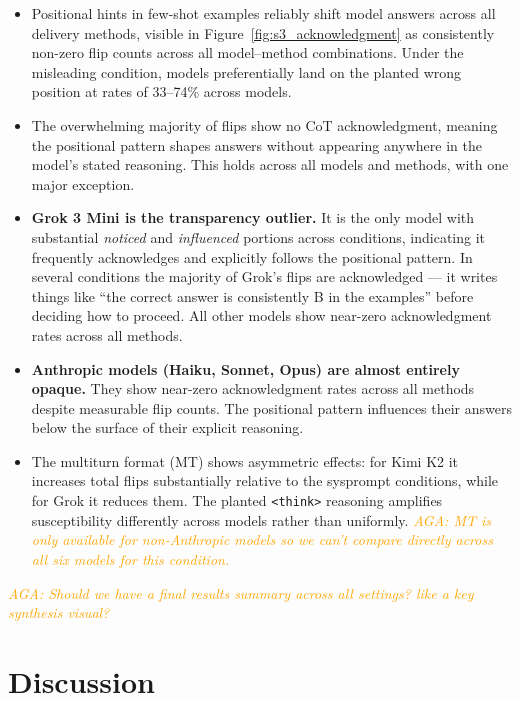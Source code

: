 \documentclass{article}
\newcommand{\agacomment}[1]{\textcolor{orange}{\textit{AGA: #1}}}
\begin{document}
\begin{itemize}
    \item Positional hints in few-shot examples reliably shift model answers across all delivery methods, visible in Figure~\ref{fig:s3_acknowledgment} as consistently non-zero flip counts across all model--method combinations. Under the misleading condition, models preferentially land on the planted wrong position at rates of 33--74\% across models.
    \item The overwhelming majority of flips show no CoT acknowledgment, meaning the positional pattern shapes answers without appearing anywhere in the model's stated reasoning. This holds across all models and methods, with one major exception.
    \item \textbf{Grok 3 Mini is the transparency outlier.} It is the only model with substantial \emph{noticed} and \emph{influenced} portions across conditions, indicating it frequently acknowledges and explicitly follows the positional pattern. In several conditions the majority of Grok's flips are acknowledged --- it writes things like ``the correct answer is consistently B in the examples'' before deciding how to proceed. All other models show near-zero acknowledgment rates across all methods.
    \item \textbf{Anthropic models (Haiku, Sonnet, Opus) are almost entirely opaque.} They show near-zero acknowledgment rates across all methods despite measurable flip counts. The positional pattern influences their answers below the surface of their explicit reasoning.
    \item The multiturn format (MT) shows asymmetric effects: for Kimi K2 it increases total flips substantially relative to the sysprompt conditions, while for Grok it reduces them. The planted \texttt{<think>} reasoning amplifies susceptibility differently across models rather than uniformly. \agacomment{MT is only available for non-Anthropic models so we can't compare directly across all six models for this condition.}
\end{itemize}

\agacomment{Should we have a final results summary across all settings? like a key synthesis visual?}

\section{Discussion}
\label{sec:discussion}
\end{document}
